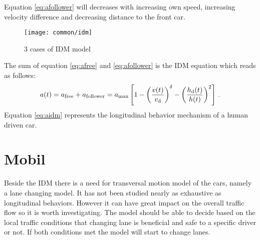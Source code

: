 		Equation \ref{eq:afollower} will decreases with increasing own speed, increasing velocity difference and decreasing distance to the front car.
		\begin{figure}[ht]
			\centering
			\texttt{[image: common/idm]}
			\caption{3 cases of IDM model}
			\label{fig:idm}
		\end{figure}
		The sum of equation \ref{eq:afree} and \ref{eq:afollower} is the IDM equation which reads as follows:
		\begin{equation}
			a(t)=a_{\rm free}+a_{\rm follower}=a_{\rm max}\left [ 1 - \left ( \frac{v(t)}{{v_{\rm d}}} \right )^{\delta} - \left ( \frac{h_{\rm d}(t)}{h(t)} \right )^2 \right ]\,.
			\label{eq:aidm}
		\end{equation}
		Equation \ref{eq:aidm} represents the longitudinal behavior mechanism of a human driven car.
	\section{Mobil} \label{sec:MOBIL}
		Beside the IDM there is a need for transversal motion model of the cars, namely a lane changing model. It has not been studied nearly as exhaustive as longitudinal behaviors. However it can have great impact on the overall traffic flow so it is worth investigating. The model should be able to decide based on the local traffic conditions that changing lane is beneficial and safe to a specific driver or not. If both conditions met the model will start to change lanes.

